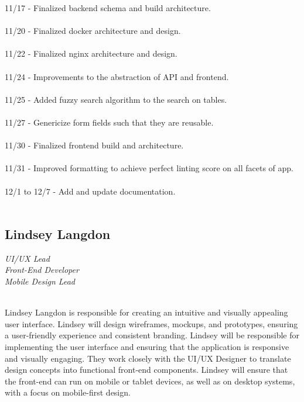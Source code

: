 \documentclass[oneside,openany,obeyspaces]{book}
\newcommand\tab[1][1cm]{\hspace*{#1}}
\begin{document}
\begin{flushleft}
    11/17 - Finalized backend schema and build architecture.\\~\\
    11/20 - Finalized docker architecture and design.\\~\\
    11/22 - Finalized nginx architecture and design.\\~\\
    11/24 - Improvements to the abstraction of API and frontend.\\~\\
    11/25 - Added fuzzy search algorithm to the search on tables.\\~\\
    11/27 - Genericize form fields such that they are reusable.\\~\\
    11/30 - Finalized frontend build and architecture.\\~\\
    11/31 - Improved formatting to achieve perfect linting score on all facets of app.\\~\\
    12/1 to 12/7 - Add and update documentation.\\~\\

    \subsection{Lindsey Langdon}

    \textit{UI/UX Lead\\
        Front-End Developer\\
        Mobile Design Lead\\~\\}

    \tab Lindsey Langdon is responsible for creating an intuitive and visually appealing user interface. Lindsey will design wireframes, mockups, and prototypes, ensuring a user-friendly experience and consistent branding. Lindsey will be responsible for implementing the user interface and ensuring that the application is responsive and visually engaging. They work closely with the UI/UX Designer to translate design concepts into functional front-end components. Lindsey will ensure that the front-end can run on mobile or tablet devices, as well as on desktop systems, with a focus on mobile-first design.\\~\\


\end{flushleft}
\end{document}
